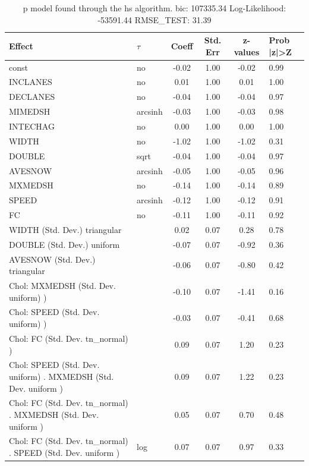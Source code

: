 \begin{table}
	\caption{p model found through the hs algorithm. bic: 107335.34 Log-Likelihood: -53591.44 RMSE_TEST: 31.39}
	\begin{center}
		\begin{tabular}{|l|l|c|c|c|l|}
			\hline
			Effect & $\tau$ & Coeff & Std. Err & z-values & Prob |z|>Z \\
			\hline
			const & no & -0.02 & 1.00 & -0.02 & 0.99 \\
			\hline
			INCLANES & no & 0.01 & 1.00 & 0.01 & 1.00 \\
			\hline
			DECLANES & no & -0.04 & 1.00 & -0.04 & 0.97 \\
			\hline
			MIMEDSH & arcsinh & -0.03 & 1.00 & -0.03 & 0.98 \\
			\hline
			INTECHAG & no & 0.00 & 1.00 & 0.00 & 1.00 \\
			\hline
			WIDTH & no & -1.02 & 1.00 & -1.02 & 0.31 \\
			\hline
			DOUBLE & sqrt & -0.04 & 1.00 & -0.04 & 0.97 \\
			\hline
			AVESNOW & arcsinh & -0.05 & 1.00 & -0.05 & 0.96 \\
			\hline
			MXMEDSH & no & -0.14 & 1.00 & -0.14 & 0.89 \\
			\hline
			SPEED & arcsinh & -0.12 & 1.00 & -0.12 & 0.91 \\
			\hline
			FC & no & -0.11 & 1.00 & -0.11 & 0.92 \\
			\hline
			WIDTH (Std. Dev.) triangular &  & 0.02 & 0.07 & 0.28 & 0.78 \\
			\hline
			DOUBLE (Std. Dev.) uniform &  & -0.07 & 0.07 & -0.92 & 0.36 \\
			\hline
			AVESNOW (Std. Dev.) triangular &  & -0.06 & 0.07 & -0.80 & 0.42 \\
			\hline
			 Chol: MXMEDSH (Std. Dev. uniform) ) &  & -0.10 & 0.07 & -1.41 & 0.16 \\
			\hline
			 Chol: SPEED (Std. Dev. uniform) ) &  & -0.03 & 0.07 & -0.41 & 0.68 \\
			\hline
			 Chol: FC (Std. Dev. tn_normal) ) &  & 0.09 & 0.07 & 1.20 & 0.23 \\
			\hline
			 Chol: SPEED (Std. Dev. uniform) . MXMEDSH (Std. Dev.   uniform ) &  & 0.09 & 0.07 & 1.22 & 0.23 \\
			\hline
			 Chol: FC (Std. Dev. tn_normal) . MXMEDSH (Std. Dev.   uniform ) &  & 0.05 & 0.07 & 0.70 & 0.48 \\
			\hline
			 Chol: FC (Std. Dev. tn_normal) . SPEED (Std. Dev.   uniform ) & log & 0.07 & 0.07 & 0.97 & 0.33 \\

\end{tabular}
\end{center}
\end{table}
